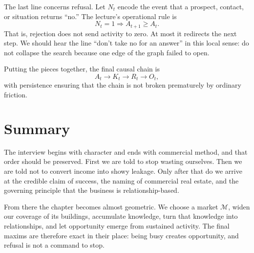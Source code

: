 The last line concerns refusal. Let \(N_t\) encode the event that a prospect, contact, or situation returns ``no.'' The lecture's operational rule is
\begin{equation}
N_t = 1 \Longrightarrow A_{t+1} \ge A_t.
\end{equation}
That is, rejection does not send activity to zero. At most it redirects the next step. We should hear the line ``don't take no for an answer'' in this local sense: do not collapse the search because one edge of the graph failed to open.

Putting the pieces together, the final causal chain is
\begin{equation}
A_t \to K_t \to R_t \to O_t,
\end{equation}
with persistence ensuring that the chain is not broken prematurely by ordinary friction.

\section{Summary}

The interview begins with character and ends with commercial method, and that order should be preserved. First we are told to stop wasting ourselves. Then we are told not to convert income into showy leakage. Only after that do we arrive at the credible claim of success, the naming of commercial real estate, and the governing principle that the business is relationship-based.

From there the chapter becomes almost geometric. We choose a market \(\mathcal{M}\), widen our coverage of its buildings, accumulate knowledge, turn that knowledge into relationships, and let opportunity emerge from sustained activity. The final maxims are therefore exact in their place: being busy creates opportunity, and refusal is not a command to stop.